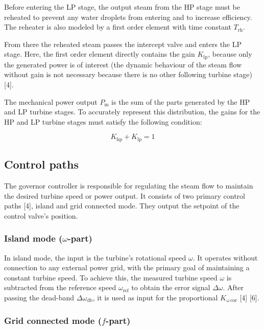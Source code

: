 \documentclass[
  a4paper,
  DIV=11,
  numbers=noendperiod]{scrartcl}
\begin{document}
Before entering the LP stage, the output steam from the HP stage must be
reheated to prevent any water droplets from entering and to increase
efficiency. The reheater is also modeled by a first order element with
time constant \(T_\mathrm{rh}\).

From there the reheated steam passes the intercept valve and enters the
LP stage. Here, the first order element directly contains the gain
\(K_\mathrm{lp}\), because only the generated power is of interest (the
dynamic behaviour of the steam flow without gain is not necessary
because there is no other following turbine stage) {[}4{]}.

The mechanical power output \(P_\mathrm{m}\) is the sum of the parts
generated by the HP and LP turbine stages. To accurately represent this
distribution, the gains for the HP and LP turbine stages must satisfy
the following condition:

\[K_\mathrm{hp} + K_\mathrm{lp}  = 1\]

\subsection{Control paths}\label{control-paths}

The governor controller is responsible for regulating the steam flow to
maintain the desired turbine speed or power output. It consists of two
primary control paths {[}4{]}, island and grid connected mode. They
output the setpoint of the control valve's position.

\subsubsection{\texorpdfstring{Island mode
(\(\omega\)-part)}{Island mode (\textbackslash omega-part)}}\label{island-mode-omega-part}

In island mode, the input is the turbine's rotational speed \(\omega\).
It operates without connection to any external power grid, with the
primary goal of maintaining a constant turbine speed. To achieve this,
the measured turbine speed \(\omega\) is subtracted from the reference
speed \(\omega_\mathrm{ref}\) to obtain the error signal
\(\Delta\omega\). After passing the dead-band
\(\Delta \omega_\mathrm{db}\), it is used as input for the proportional
\(K_\mathrm{\omega\,cor}\) {[}4{]} {[}6{]}.

\subsubsection{\texorpdfstring{Grid connected mode
(\(f\)-part)}{Grid connected mode (f-part)}}\label{grid-connected-mode-f-part}
\end{document}

